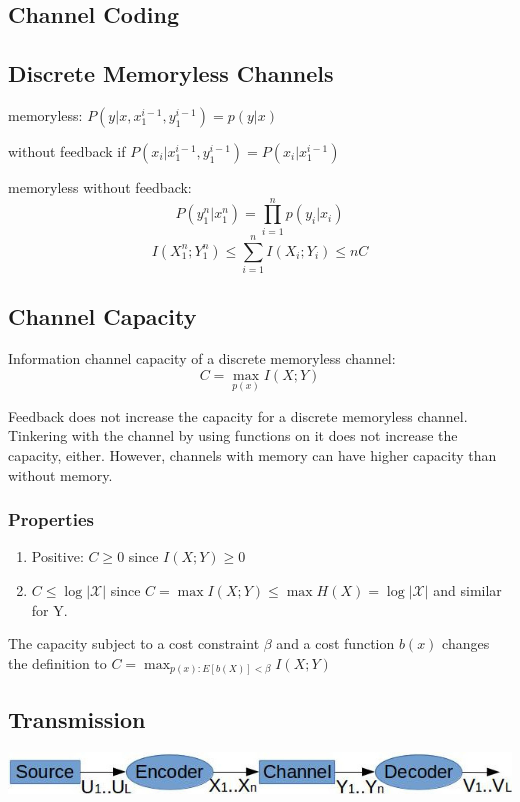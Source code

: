 \documentclass[10pt,a4paper,landscape]{article}
\begin{document}
\begin{multicols*}{4}
\section{Channel Coding}
\subsection{Discrete Memoryless Channels}
memoryless: $P(y|x, x_1^{i-1}, y_1^{i-1}) = p(y|x)$

without feedback if $P(x_i|x_1^{i-1},y_1^{i-1}) = P(x_i|x_1^{i-1})$

memoryless without feedback: $$P(y_1^n | x_1^n) = \prod_{i=1}^n p(y_i|x_i)$$
$$I(X_1^n;Y_1^n) \leq \sum_{i=1}^n I(X_i;Y_i) \leq nC$$

\subsection{Channel Capacity}
Information channel capacity of a discrete memoryless channel:
$$C = \max_{p(x)} I(X; Y)$$

Feedback does not increase the capacity for a discrete memoryless channel. Tinkering with the channel by using functions on it does not increase the capacity, either. However, channels with memory can have higher capacity than without memory.

\subsubsection{Properties}
\begin{enumerate}
	\item Positive: $C \geq 0$ since $I(X; Y) \geq 0$
	\item $C \leq \log | \mathcal{X} |$ since $C = \max I(X; Y) \leq \max H(X) =  \log | \mathcal{X} |$ and similar for Y.
\end{enumerate}

The capacity subject to a cost constraint $\beta$ and a cost function $b(x)$ changes the definition to $C = \max_{p(x): E[b(X)] < \beta} I(X; Y)$

\subsection{Transmission}
\begin{colfig}
	\centering
	\includegraphics[width=\linewidth]{comm-setup.png}
\end{colfig}


\end{multicols*}
\end{document}
